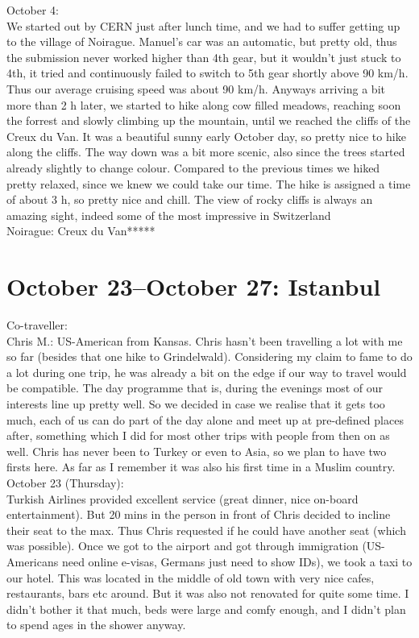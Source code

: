 October 4:\\
We started out by CERN just after lunch time, and we had to suffer getting up to the village of Noirague. Manuel's car was an automatic, but pretty old, thus the submission never worked higher than 4th gear, but it wouldn't just stuck to 4th, it tried and continuously failed to switch to 5th gear shortly above 90 km/h. Thus our average cruising speed was about 90 km/h. Anyways arriving a bit more than 2 h later, we started to hike along cow filled meadows, reaching soon the forrest and slowly climbing up the mountain, until we reached the cliffs of the Creux du Van. It was a beautiful sunny early October day, so pretty nice to hike along the cliffs. The way down was a bit more scenic, also since the trees started already slightly to change colour. Compared to the previous times we hiked pretty relaxed, since we knew we could take our time. The hike is assigned a time of about 3 h, so pretty nice and chill. The view of rocky cliffs is always an amazing sight, indeed some of the most impressive in Switzerland\\

Noirague: Creux du Van*****

\section{October 23--October 27: Istanbul}
\label{Istanbul2014}

Co-traveller:\\
Chris M.: US-American from Kansas. Chris hasn't been travelling a lot with me so far (besides that one hike to Grindelwald). Considering my claim to fame to do a lot during one trip, he was already a bit on the edge if our way to travel would be compatible. The day programme that is, during the evenings most of our interests line up pretty well. So we decided in case we realise that it gets too much, each of us can do part of the day alone and meet up at pre-defined places after, something which I did for most other trips with people from then on as well. Chris has never been to Turkey or even to Asia, so we plan to have two firsts here. As far as I remember it was also his first time in a Muslim country.\\

October 23 (Thursday):\\
Turkish Airlines provided excellent service (great dinner, nice on-board entertainment). But 20 mins in the person in front of Chris decided to incline their seat to the max. Thus Chris requested if he could have another seat (which was possible). Once we got to the airport and got through immigration (US-Americans need online e-visas, Germans just need to show IDs), we took a taxi to our hotel. This was located in the middle of old town with very nice cafes, restaurants, bars etc around. But it was also not renovated for quite some time. I didn't bother it that much, beds were large and comfy enough, and I didn't plan to spend ages in the shower anyway.\\


